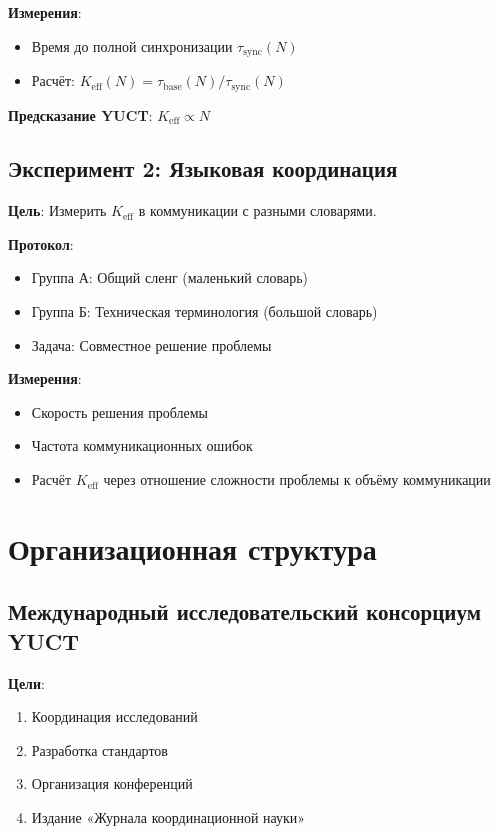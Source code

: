 \documentclass[12pt,a4paper]{article}
\begin{document}
	\textbf{Измерения}:
	\begin{itemize}
		\item Время до полной синхронизации $\tau_{\mathrm{sync}}(N)$
		\item Расчёт: $K_{\mathrm{eff}}(N) = \tau_{\mathrm{base}}(N)/\tau_{\mathrm{sync}}(N)$
	\end{itemize}
	
	\textbf{Предсказание YUCT}: $K_{\mathrm{eff}} \propto N$
	
	\subsection{Эксперимент 2: Языковая координация}
	
	\textbf{Цель}: Измерить $K_{\mathrm{eff}}$ в коммуникации с разными словарями.
	
	\textbf{Протокол}:
	\begin{itemize}
		\item Группа А: Общий сленг (маленький словарь)
		\item Группа Б: Техническая терминология (большой словарь)
		\item Задача: Совместное решение проблемы
	\end{itemize}
	
	\textbf{Измерения}:
	\begin{itemize}
		\item Скорость решения проблемы
		\item Частота коммуникационных ошибок
		\item Расчёт $K_{\mathrm{eff}}$ через отношение сложности проблемы к объёму коммуникации
	\end{itemize}
	
	\section{Организационная структура}
	
	\subsection{Международный исследовательский консорциум YUCT}
	
	\textbf{Цели}:
	\begin{enumerate}
		\item Координация исследований
		\item Разработка стандартов
		\item Организация конференций
		\item Издание «Журнала координационной науки»
	\end{enumerate}
	
\end{document}
